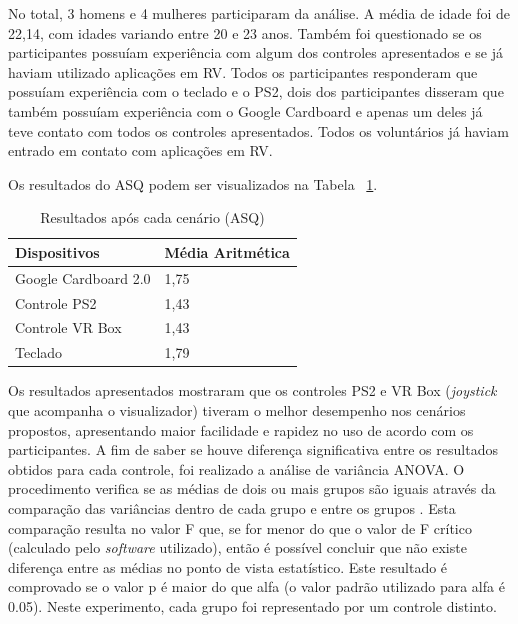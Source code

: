 No total, 3 homens e 4 mulheres participaram da análise. A média de idade foi de 22,14, com idades variando entre 20 e 23 anos. Também foi questionado se os participantes possuíam experiência com algum dos controles apresentados e se já haviam utilizado aplicações em RV. Todos os participantes responderam que possuíam experiência com o teclado e o PS2, dois dos participantes disseram que também possuíam experiência com o Google Cardboard e apenas um deles já teve contato com todos os controles apresentados. Todos os voluntários já haviam entrado em contato com aplicações em RV.

Os resultados do ASQ podem ser visualizados na Tabela ~\ref{t.ASQ}.

\begin{table}[H]	
	\caption{Resultados após cada cenário (ASQ)} 
	\label{t.ASQ} 
	\centering
	\begin{tabular}{l|l}
	\textbf{\small Dispositivos } & \textbf{\small Média Aritmética} \\\hline
	
	{\small Google Cardboard 2.0} & {\small 1,75}  \\\hline	
	
	{\small Controle PS2} & {\small 1,43}  \\\hline		 
	
	{\small Controle VR Box} & {\small 1,43}  \\\hline  
	
	{\small Teclado} & {\small 1,79} \\\hline	
	\end{tabular}
\end{table}

Os resultados apresentados mostraram que os controles PS2 e VR Box (\textit{joystick} que acompanha o visualizador) tiveram o melhor desempenho nos cenários propostos, apresentando maior facilidade e rapidez no uso de acordo com os participantes. A fim de saber se houve diferença significativa entre os resultados obtidos para cada controle, foi realizado a análise de variância ANOVA. O procedimento verifica se as médias de dois ou mais grupos são iguais através da comparação das variâncias dentro de cada grupo e entre os grupos \cite{minitab}. Esta comparação resulta no valor F que, se for menor do que o valor de F crítico (calculado pelo \textit{software} utilizado), então é possível concluir que não existe diferença entre as médias no ponto de vista estatístico. Este resultado é comprovado se o valor p é maior do que alfa (o valor padrão utilizado para alfa é 0.05). Neste experimento, cada grupo foi representado por um controle distinto.

